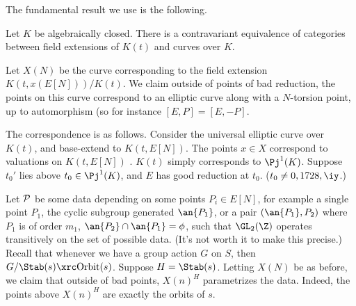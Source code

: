 The fundamental result we use is the following.
\begin{thm}
Let $K$ be algebraically closed. 
There is a contravariant equivalence of categories between field extensions of $K(t)$ and curves over $K$.
\end{thm}

Let $X(N)$ be the curve corresponding to the field extension $K(t,x(E[N]))/K(t)$. We claim outside of points of bad reduction, the points on this curve correspond to an elliptic curve along with a $N$-torsion point, up to automorphism (so for instance $[E,P]=[E,-P]$. 

The correspondence is as follows. Consider the universal elliptic curve over $K(t)$, and base-extend to $K(t,E[N])$. The points $x\in X$ correspond to valuations on $K(t,E[N])$ . $K(t)$ simply corresponds to $\Pj^1(K)$. Suppose $t_0'$ lies above $t_0\in \Pj^1(K)$, and $E$ has good reduction at $t_0$. ($t_0\ne 0,1728,\iy$.) 


Let $\cal P$ be some data depending on some points $P_i\in E[N]$, for example a single point $P_1$, the cyclic subgroup generated $\an{P_1}$, or a pair $(\an{P_1},P_2)$ where $P_1$ is of order $m_1$, $\an{P_2}\cap \an{P_1}=\phi$, such that $\GL_2(\Z)$ operates transitively on the set of possible data. (It's not worth it to make this precise.)
Recall that whenever we have a group action $G$ on $S$, then $G/\Stab(s)\xrc \text{Orbit}(s)$. Suppose $H=\Stab(s)$. Letting $X(N)$ be as before, we claim that outside of bad points, $X(n)^H$ parametrizes the data. Indeed, the points above $X(n)^H$ are exactly the orbits of $s$.

